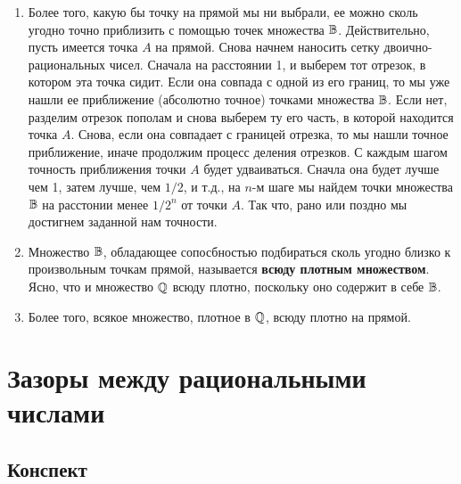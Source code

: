 \begin{enumerate}
\item Более того, какую бы точку на прямой мы ни выбрали, ее можно сколь угодно точно приблизить с помощью точек множества $\mathbb B$. Действительно, пусть имеется точка $A$ на прямой. Снова начнем наносить сетку двоично-рациональных чисел. Сначала на расстоянии 1, и выберем тот отрезок, в котором эта точка сидит. Если она совпада с одной из его границ, то мы уже нашли ее приближение (абсолютно точное) точками множества $\mathbb B$. Если нет, разделим отрезок пополам и снова выберем ту его часть, в которой находится точка $A$. Снова, если она совпадает с границей отрезка, то мы нашли точное приближение, иначе продолжим процесс деления отрезков. С каждым шагом точность приближения точки $A$ будет удваиваться. Сначла она будет лучше чем 1, затем лучше, чем $1/2$, и т.д., на $n$-м шаге мы найдем точки множества $\mathbb B$ на расстонии менее $1/2^n$ от точки $A$. Так что, рано или поздно мы достигнем заданной нам точности.
\item Множество $\mathbb B$, обладающее сопосбностью подбираться сколь угодно близко к произвольным точкам прямой, называется \textbf{всюду плотным множеством}. Ясно, что и множество $\mathbb Q$ всюду плотно, поскольку оно содержит в себе $\mathbb B$.
\item Более того, всякое множество, плотное в $\mathbb Q$, всюду плотно на прямой.
\end{enumerate}


\section{Зазоры между рациональными числами}

\subsection*{Конспект}

